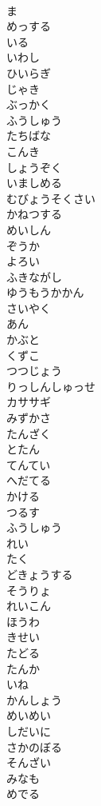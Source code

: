 \documentclass[8pt]{extreport}
\begin{document}
\begin{CJK}{UTF8}{min}
\\	ま
\\	めっする
\\	いる
\\	いわし
\\	ひいらぎ
\\	じゃき
\\	ぶっかく
\\	ふうしゅう
\\	たちばな
\\	こんき
\\	しょうぞく
\\	いましめる
\\	むびょうそくさい
\\	かねつする
\\	めいしん
\\	ぞうか
\\	よろい
\\	ふきながし
\\	ゆうもうかかん
\\	さいやく
\\	あん
\\	かぶと
\\	くずこ
\\	つつじょう
\\	りっしんしゅっせ
\\	カササギ
\\	みずかさ
\\	たんざく
\\	とたん
\\	てんてい
\\	へだてる
\\	かける
\\	つるす
\\	ふうしゅう
\\	れい
\\	たく
\\	どきょうする
\\	そうりょ
\\	れいこん
\\	ほうわ
\\	きせい
\\	たどる
\\	たんか
\\	いね
\\	かんしょう
\\	めいめい
\\	しだいに
\\	さかのぼる
\\	そんざい
\\	みなも
\\	めでる

\end{CJK}
\end{document}
